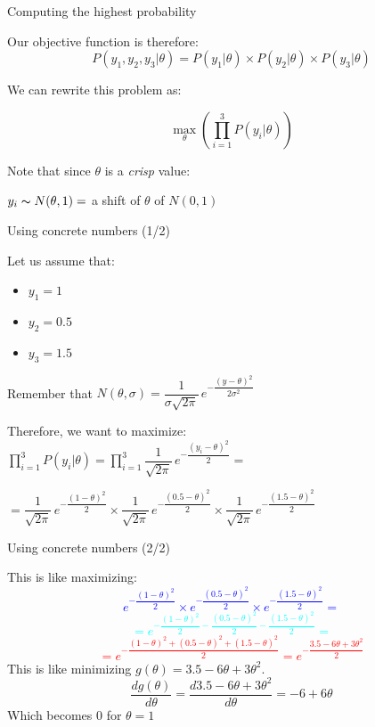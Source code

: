 \documentclass{beamer}
\begin{document}
\begin{frame}
{\centerline{Computing the highest probability}}
Our objective function is therefore:
$$P(y_1, y_2, y_3 | \theta) = P(y_1 | \theta) \times P(y_2 | \theta) \times P(y_3 | \theta)$$

We can rewrite this problem as:

$$ \max_{\theta}(\prod_{i=1}^3 P(y_i | \theta)) $$
\vspace*{0.2cm}

Note that since $\theta$ is a \textit{crisp} value:
\centerline{
$ y_i \thicksim N(\theta,1) = $ a shift of $\theta$ of $N(0,1) $}


\end{frame}

\begin{frame}
{\centerline{Using concrete numbers (1/2)}}
Let us assume that:
\begin{itemize}
\item $y_1 = 1$
\item $y_2 = 0.5$
\item $y_3 = 1.5$
\end{itemize}
Remember that $N(\theta,\sigma) = \dfrac 1 {\sigma \sqrt{2 \pi} } \, e^{-\dfrac { \left({y - \theta}\right)^2} {2 \sigma^2} }$\\
\vspace{0.5cm}

Therefore, we want to maximize:\\
$ \prod_{i=1}^3 P(y_i | \theta) = \prod_{i=1}^3 \dfrac 1 {\sqrt{2 \pi} } \, e^{-\dfrac { \left({y_i - \theta}\right)^2} {2} } = $\\
\vspace{0.5cm}

$= \dfrac 1 {\sqrt{2 \pi} } \, e^{-\dfrac { \left({1 - \theta}\right)^2} {2} } \times  \dfrac 1 {\sqrt{2 \pi} } \, e^{-\dfrac { \left({0.5 - \theta}\right)^2} {2} } \times  \dfrac 1 {\sqrt{2 \pi} } \, e^{-\dfrac { \left({1.5 - \theta}\right)^2} {2} }$

\end{frame}

\begin{frame}
{\centerline{Using concrete numbers (2/2)}}

This is like maximizing:
\textcolor{blue}{
$$e^{-\dfrac { \left({1 - \theta}\right)^2} {2} } \times e^{-\dfrac { \left({0.5 - \theta}\right)^2} {2} } \times e^{-\dfrac { \left({1.5 - \theta}\right)^2} {2} } = $$
}\textcolor{cyan}{
$$ = e^{-\dfrac { \left({1 - \theta}\right)^2} {2} -\dfrac { \left({0.5 - \theta}\right)^2} {2} -\dfrac { \left({1.5 - \theta}\right)^2} {2}} = $$
}\textcolor{red}{
$$ = e^{-\dfrac { ({1 - \theta})^2 + ({0.5 - \theta})^2 + ({1.5 - \theta})^2 } {2} } = e^{-\dfrac { 3.5 - 6 \theta + 3 \theta ^2 } {2} } $$
}
This is like minimizing $ g(\theta) = 3.5 - 6 \theta + 3 \theta ^2 $.
$$\frac{d g(\theta)}{d \theta} = \frac{d 3.5 - 6 \theta + 3 \theta ^2}{d \theta} = -6 + 6 \theta$$
Which becomes 0 for $\theta = 1$

\end{frame}
\end{document}
